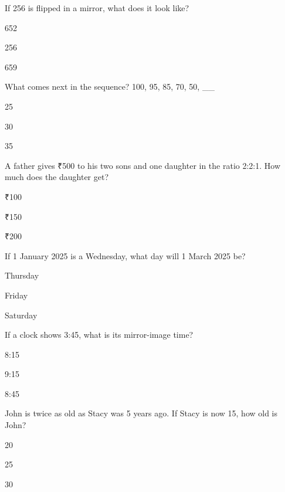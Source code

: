 \begin{enhancedmcq}{If 256 is flipped in a mirror, what does it look like?}
\item 652
\item 256
\item 659

\end{enhancedmcq}
\begin{enhancedmcq}{What comes next in the sequence? 100, 95, 85, 70, 50, __}
\item 25
\item 30
\item 35

\end{enhancedmcq}
\begin{enhancedmcq}{A father gives ₹500 to his two sons and one daughter in the ratio 2:2:1. How much does the daughter get?}
\item ₹100
\item ₹150
\item ₹200

\end{enhancedmcq}
\begin{enhancedmcq}{If 1 January 2025 is a Wednesday, what day will 1 March 2025 be?}
\item Thursday
\item Friday
\item Saturday

\end{enhancedmcq}
\begin{enhancedmcq}{If a clock shows 3:45, what is its mirror-image time?}
\item 8:15
\item 9:15
\item 8:45

\end{enhancedmcq}
\begin{enhancedmcq}{John is twice as old as Stacy was 5 years ago. If Stacy is now 15, how old is John?}
\item 20
\item 25
\item 30

\end{enhancedmcq}
